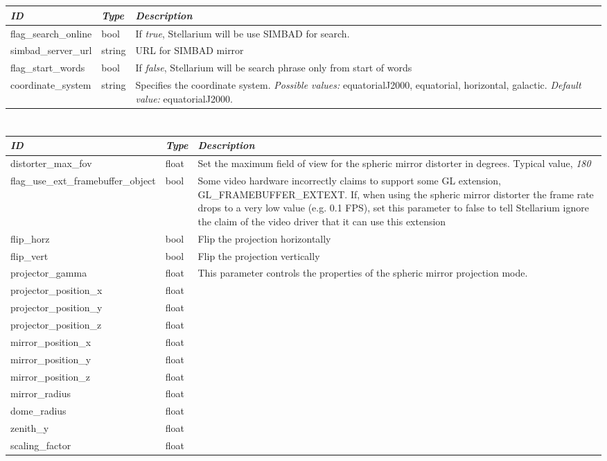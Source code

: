 \section{}\label{section-search}

\begin{longtabu} to \textwidth {l|l|X}
\toprule
\emph{ID} & \emph{Type} & \emph{Description}\tabularnewline
\midrule
flag\_search\_online & bool & If \emph{true}, Stellarium will be use SIMBAD for search.\tabularnewline
\midrule
simbad\_server\_url & string & URL for SIMBAD mirror\tabularnewline
\midrule
flag\_start\_words & bool & If \emph{false}, Stellarium will be search phrase only from start of words\tabularnewline
\midrule
coordinate\_system & string & Specifies the coordinate system. \emph{Possible values:} equatorialJ2000, equatorial, horizontal,
galactic. \emph{Default value:} equatorialJ2000.\tabularnewline
\bottomrule
\end{longtabu}

\section{}\label{section-sphericux5fmirror}

\begin{longtabu} to \textwidth {l|l|X}
\toprule
\emph{ID} & \emph{Type} & \emph{Description}\tabularnewline
\midrule
distorter\_max\_fov & float & Set the maximum field of view
for the spheric mirror distorter in degrees. Typical value,
\emph{180}\tabularnewline
\midrule
flag\_use\_ext\_framebuffer\_object & bool & Some video
hardware incorrectly claims to support some GL extension,
GL\_FRAMEBUFFER\_EXTEXT. If, when using the spheric mirror distorter the
frame rate drops to a very low value (e.g. 0.1 FPS), set this parameter
to false to tell Stellarium ignore the claim of the video driver that it
can use this extension\tabularnewline
\midrule
flip\_horz & bool & Flip the projection horizontally\tabularnewline
\midrule
flip\_vert & bool & Flip the projection vertically\tabularnewline
\midrule
projector\_gamma & float & This parameter controls the
properties of the spheric mirror projection mode.\tabularnewline
\midrule
projector\_position\_x & float & \tabularnewline
\midrule
projector\_position\_y & float & \tabularnewline
\midrule
projector\_position\_z & float & \tabularnewline
\midrule
mirror\_position\_x & float & \tabularnewline
\midrule
mirror\_position\_y & float & \tabularnewline
\midrule
mirror\_position\_z & float & \tabularnewline
\midrule
mirror\_radius & float & \tabularnewline
\midrule
dome\_radius & float & \tabularnewline
\midrule
zenith\_y & float & \tabularnewline
\midrule
scaling\_factor & float & \tabularnewline
\bottomrule
\end{longtabu}


